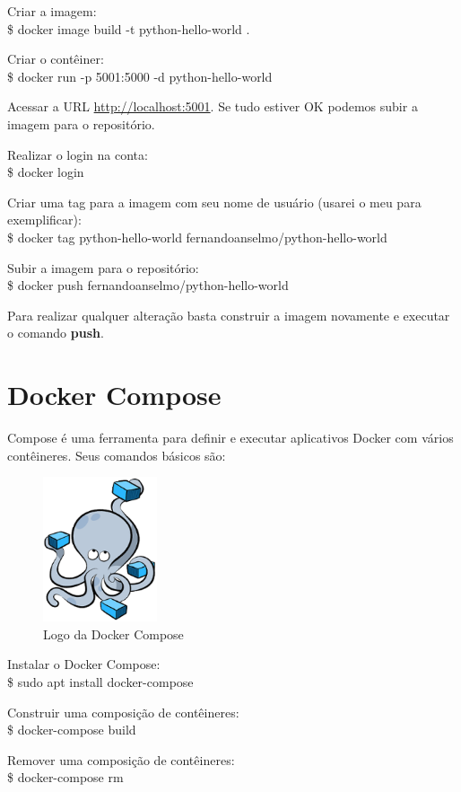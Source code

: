 \documentclass[a4paper,11pt]{article}
\begin{document}
Criar a imagem: \\
{\ttfamily\$ docker image build -t python-hello-world .}

Criar o contêiner: \\
{\ttfamily\$ docker run -p 5001:5000 -d python-hello-world}

Acessar a URL \url{http://localhost:5001}. Se tudo estiver OK podemos subir a imagem para o repositório. 

Realizar o login na conta: \\
{\ttfamily\$ docker login}

Criar uma tag para a imagem com seu nome de usuário (usarei o meu para exemplificar): \\
{\ttfamily\$ docker tag python-hello-world fernandoanselmo/python-hello-world} 

Subir a imagem para o repositório: \\
{\ttfamily\$ docker push fernandoanselmo/python-hello-world}

Para realizar qualquer alteração basta construir a imagem novamente e executar o comando \textbf{push}.

\section{Docker Compose}
Compose é uma ferramenta para definir e executar aplicativos Docker com vários contêineres. Seus comandos básicos são:
\begin{figure}[!htb]
	\centering
	\includegraphics[width=0.3\textwidth]{imagem/DockerCompose.png}
	\caption{Logo da Docker Compose}
\end{figure}

Instalar o Docker Compose: \\
{\ttfamily\$ sudo apt install docker-compose}

Construir uma composição de contêineres: \\
{\ttfamily\$ docker-compose build}

Remover uma composição de contêineres: \\
{\ttfamily\$ docker-compose rm}
\end{document}
